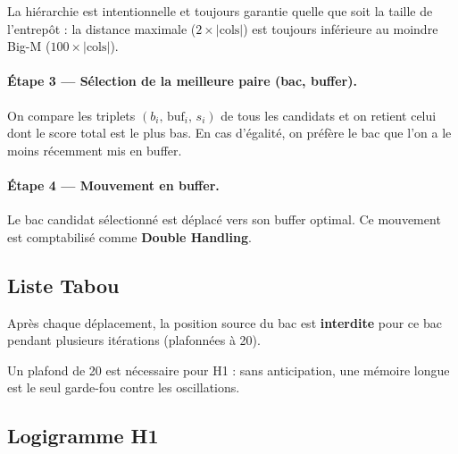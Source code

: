 \documentclass[12pt,a4paper]{article}
\begin{document}
La hiérarchie est intentionnelle et toujours garantie quelle que soit la taille de
l'entrepôt : la distance maximale ($2\times|\text{cols}|$) est toujours inférieure
au moindre Big-M ($100\times|\text{cols}|$).

\paragraph{Étape 3 — Sélection de la meilleure paire (bac, buffer).}
On compare les triplets $(b_i,\, \text{buf}_i,\, s_i)$ de tous les candidats
et on retient celui dont le score total est le plus bas. En cas d'égalité,
on préfère le bac que l'on a le moins récemment mis en buffer.

\paragraph{Étape 4 — Mouvement en buffer.}
Le bac candidat sélectionné est déplacé vers son buffer optimal.
Ce mouvement est comptabilisé comme \textbf{Double Handling}.


\subsection{Liste Tabou}

Après chaque déplacement, la position source du bac est
\textbf{interdite} pour ce bac pendant plusieurs itérations (plafonnées à 20).

Un plafond de 20 est nécessaire pour H1 : sans anticipation,
une mémoire longue est le seul garde-fou contre les oscillations.

\subsection{Logigramme H1}
\end{document}
